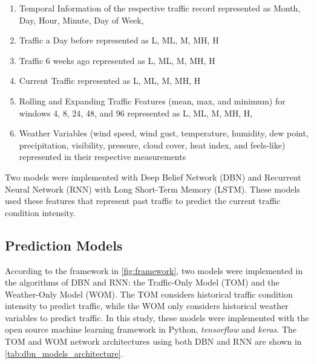 \begin{enumerate}
\item Temporal Information of the respective traffic record represented as Month, Day, Hour, Minute, Day of Week,
\item Traffic a Day before represented as L, ML, M, MH, H
\item Traffic 6 weeks ago represented as L, ML, M, MH, H
\item Current Traffic represented as L, ML, M, MH, H
\item Rolling and Expanding Traffic Features (mean, max, and minimum) for windows 4, 8, 24, 48, and 96 represented as L, ML, M, MH, H,
\item Weather Variables (wind speed, wind gust, temperature, humidity, dew point, precipitation, visibility, pressure, cloud cover, heat index, and feels-like) represented in their respective measurements
\end{enumerate}

Two models were implemented with Deep Belief Network (DBN) and Recurrent Neural Network (RNN) with Long Short-Term Memory (LSTM). These models used these features that represent past traffic to predict the current traffic condition intensity.

\subsection{Prediction Models}
According to the framework in \ref{fig:framework}, two models were implemented in the algorithms of DBN and RNN: the Traffic-Only Model (TOM) and the Weather-Only Model (WOM). The TOM considers historical traffic condition intensity to predict traffic, while the WOM only considers historical weather variables to predict traffic. In this study, these models were implemented with the open source machine learning framework in Python, \textit{tensorflow} and \textit{keras}. The TOM and WOM network architectures using both DBN and RNN are shown in \ref{tab:dbn_models_architecture}. 

